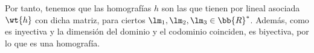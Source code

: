 \begin{ejercicio}
    Por tanto, tenemos que las homografías $h$ son las que
    tienen por lineal asociada $\wt{h}$ con dicha matriz, para ciertos $\lm_1, \lm_2, \lm_3 \in \bb{R}^\ast$.
    Además, como es inyectiva y la dimensión del dominio y el codominio coinciden, es biyectiva, por lo que es una homografía.
\end{ejercicio}